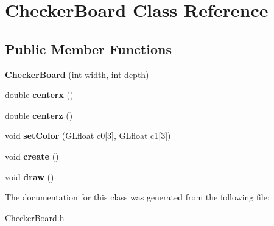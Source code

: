 \hypertarget{class_checker_board}{}\section{Checker\+Board Class Reference}
\label{class_checker_board}
\subsection*{Public Member Functions}
\begin{DoxyCompactItemize}
\item 
\mbox{\label{class_checker_board_a25a56bec16a1dff98438f7a144bc5922}} 
{\bfseries Checker\+Board} (int width, int depth)
\item 
\mbox{\label{class_checker_board_a4e07955cf06a9362ee3437795c3add88}} 
double {\bfseries centerx} ()
\item 
\mbox{\label{class_checker_board_afc3f580a5eb44d6922456ec8f8ce6c33}} 
double {\bfseries centerz} ()
\item 
\mbox{\label{class_checker_board_aab63f13410b7b7286fce32a1171027af}} 
void {\bfseries set\+Color} (G\+Lfloat c0\mbox{[}3\mbox{]}, G\+Lfloat c1\mbox{[}3\mbox{]})
\item 
\mbox{\label{class_checker_board_ac9d20d984765bba78ecd5c0028980dd2}} 
void {\bfseries create} ()
\item 
\mbox{\label{class_checker_board_ac727ee4f4924e77702ee86e713ca90e6}} 
void {\bfseries draw} ()
\end{DoxyCompactItemize}


The documentation for this class was generated from the following file\+:\begin{DoxyCompactItemize}
\item 
Checker\+Board.\+h\end{DoxyCompactItemize}
